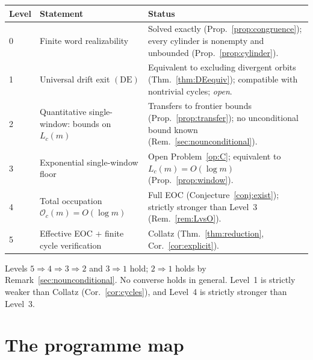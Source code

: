 \documentclass[11pt]{article}
\theoremstyle{plain}
\theoremstyle{definition}
\theoremstyle{remark}
\newcommand{\Occ}{\mathcal{O}}
\begin{document}
\begin{center}
\small
\begin{tabular}{@{}llp{}@{}}
\toprule
Level & Statement & Status \\
\midrule
0 & Finite word realizability & Solved exactly (Prop.~\ref{prop:congruence}); every cylinder is
    nonempty and unbounded (Prop.~\ref{prop:cylinder}). \\
1 & Universal drift exit $(\mathrm{DE})$ & Equivalent to excluding divergent orbits
    (Thm.~\ref{thm:DEequiv}); compatible with nontrivial cycles; \emph{open}. \\
2 & Quantitative single-window: bounds on $L_c(m)$ & Transfers to frontier bounds
    (Prop.~\ref{prop:transfer}); no unconditional bound known (Rem.~\ref{sec:nounconditional}). \\
3 & Exponential single-window floor & Open Problem~\ref{op:C}; equivalent to
    $L_c(m)=O(\log m)$ (Prop.~\ref{prop:window}). \\
4 & Total occupation $\Occ_c(m)=O(\log m)$ & Full EOC (Conjecture~\ref{conj:exist}); strictly
    stronger than Level~3 (Rem.~\ref{rem:LvsO}). \\
5 & Effective EOC $+$ finite cycle verification & Collatz (Thm.~\ref{thm:reduction},
    Cor.~\ref{cor:explicit}). \\
\bottomrule
\end{tabular}
\end{center}

Levels $5\Rightarrow4\Rightarrow3\Rightarrow2$ and $3\Rightarrow1$ hold; $2\Rightarrow1$ holds by
Remark~\ref{sec:nounconditional}. No converse holds in general. Level~1 is strictly weaker than
Collatz (Cor.~\ref{cor:cycles}), and Level~4 is strictly stronger than Level~3.

\section{The programme map}\label{sec:map}
\end{document}
